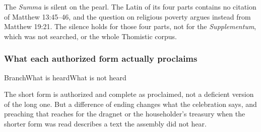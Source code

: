The \emph{Summa} is silent on the pearl. The Latin of its four parts contains no citation of Matthew 13:45--46, and the question on religious poverty argues instead from Matthew 19:21. The silence holds for those four parts, not for the \emph{Supplementum}, which was not searched, or the whole Thomistic corpus.

\subsubsection*{What each authorized form actually proclaims}

\begin{threecoltable}{Branch}{What is heard}{What is not heard}
\end{threecoltable}

The short form is authorized and complete as proclaimed, not a deficient version of the long one. But a difference of ending changes what the celebration says, and preaching that reaches for the dragnet or the householder's treasury when the shorter form was read describes a text the assembly did not hear.
